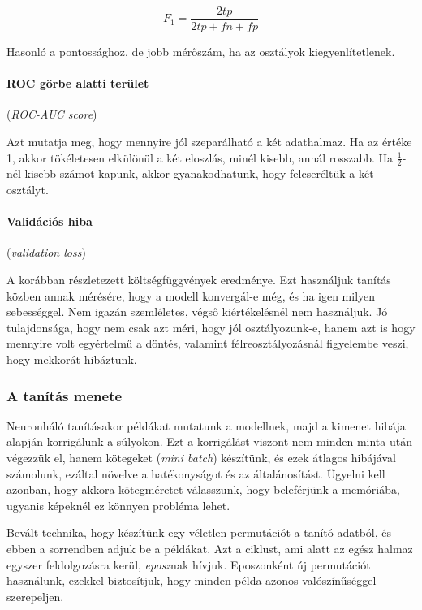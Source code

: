 \[  F_1 = \dfrac{2tp}{2tp + fn + fp}  \]

\noindent
Hasonló a pontossághoz, de jobb mérőszám, ha az osztályok kiegyenlítetlenek.



\paragraph{ROC görbe alatti terület} (\textit{ROC-AUC score})

Azt mutatja meg, hogy mennyire jól szeparálható a két adathalmaz. 
Ha az értéke 1, akkor tökéletesen elkülönül a két eloszlás, 
minél kisebb, annál rosszabb. Ha $ \frac{1}{2} $-nél kisebb számot kapunk,
akkor gyanakodhatunk, hogy felcseréltük a két osztályt.

\paragraph{Validációs hiba} (\textit{validation loss})

A korábban részletezett költségfüggvények eredménye. Ezt használjuk
tanítás közben annak mérésére, hogy a modell konvergál-e még,
és ha igen milyen sebességgel. Nem igazán szemléletes, végső kiértékelésnél
nem használjuk. Jó tulajdonsága, hogy nem csak azt méri, hogy jól
osztályozunk-e, hanem azt is hogy mennyire volt egyértelmű a döntés,
valamint félreosztályozásnál figyelembe veszi, hogy mekkorát hibáztunk.



\subsubsection{A tanítás menete}

Neuronháló tanításakor példákat mutatunk a modellnek, majd a kimenet
hibája alapján korrigálunk a súlyokon. Ezt a korrigálást viszont nem
minden minta után végezzük el, hanem kötegeket (\textit{mini batch}) 
készítünk, és ezek átlagos hibájával számolunk, ezáltal 
növelve a hatékonyságot és az általánosítást. Ügyelni kell azonban, hogy
akkora kötegméretet válasszunk, hogy beleférjünk a memóriába, ugyanis 
képeknél ez könnyen probléma lehet.


Bevált technika, hogy készítünk egy véletlen permutációt a tanító adatból,
és ebben a sorrendben adjuk be a példákat. Azt a ciklust, ami alatt 
az egész halmaz egyszer feldolgozásra kerül, \textit{eposz}nak hívjuk.
Eposzonként új permutációt használunk, ezekkel biztosítjuk, hogy minden
példa azonos valószínűséggel szerepeljen.

